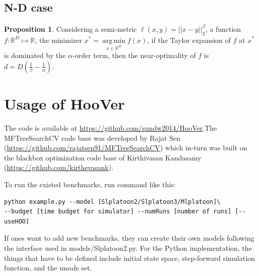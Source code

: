 \documentclass[11pt]{article}
\DeclareMathOperator*{\argmin}{arg\,min}
\theoremstyle{definition}
\newtheorem{prop}{Proposition}
\newcommand{\toolname}{{{\sf HooVer}\xspace}}
\begin{document}
\begin{appendices}
\subsection{N-D case}
\begin{prop}
Considering a semi-metric $\ell(x, y) = ||x - y||_2^\beta$, a function $f: \mathbb{R}^D \mapsto \mathbb{R}$, the minimizer $x^* = \argmin\limits_{x \in \mathbb{R}^D} f(x)$, if the Taylor expansion of $f$ at $x^*$ is dominated by the $\alpha$-order term, then the near-optimality of $f$ is $d = D(\frac{1}{\beta} - \frac{1}{\alpha})$.
\end{prop}

\section{Usage of \toolname}
The code is available at \url{https://github.com/sundw2014/HooVer}.The MFTreeSearchCV code base was developed by Rajat Sen (\url{https://github.com/rajatsen91/MFTreeSearchCV}) which in-turn was built on the blackbox optimization code base of Kirthivasan Kandasamy (\url{https://github.com/kirthevasank}).

To run the existed benchmarks, run command like this:

\begin{verbatim}
python example.py --model [Slplatoon2/Slplatoon3/Mlplatoon]\
--budget [time budget for simulator] --numRuns [number of runs] [--useHOO]
\end{verbatim}

If ones want to add new benchmarks, they can create their own models following the interface used in models/Slplatoon2.py. For the Python implementation, the things that have to be defined include initial state space, step-forward simulation function, and the unsafe set.
\end{appendices}
\end{document}
